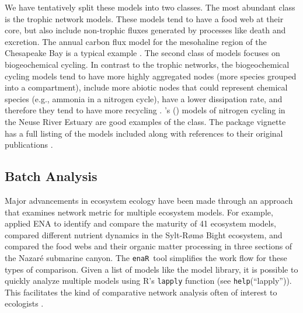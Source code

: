 \documentclass[11pt]{article}
\def\citeapos#1{\citeauthor{#1}'s (\citeyear{#1})}
\newcommand{\enaR}{\texttt{enaR}}
\begin{document}
\begin{spacing}{2}
We have tentatively split these models into two classes.  The most
abundant class is the trophic network models. %
These models tend to have a food web at their core, but also include
non-trophic fluxes generated by processes like death and excretion.
The annual carbon flux model for the mesohaline region of the
Chesapeake Bay is a typical example \citep{baird89}.  The second class
of models focuses on biogeochemical cycling.  %
In contrast to the trophic networks, the biogeochemical cycling models
tend to have more highly aggregated nodes (more species grouped into a
compartment), include more abiotic nodes that could represent chemical
species (e.g., ammonia in a nitrogen cycle), have a lower dissipation
rate, and therefore they tend to have more recycling
\citep{christian96, borrett10_idd}.  \citeapos{christian03} models of
nitrogen cycling in the Neuse River Estuary are good examples of the
class.  The package vignette has a full listing of the models included
along with references to their original publications \citep{enar}.

\subsection{Batch Analysis}
Major advancements in ecosystem ecology have been made through an
approach that examines network metric for multiple ecosystem
models. For example, \citet{christensen95} applied ENA to identify and
compare the maturity of 41 ecosystem models,
\citet{baird08_sylt} compared different nutrient dynamics in the
Sylt-R{\o}m{\o} Bight ecosystem, and \citet{vanoevelen2011canyon}
compared the food webs and their organic matter processing in three
sections of the Nazar{\'e} submarine canyon.  The \enaR\ tool
simplifies the work flow for these types of comparison. Given a list
of models like the model library, it is possible to quickly analyze
multiple models using R's \texttt{lapply} function (see
\texttt{help}(``lapply'')).  This facilitates the kind of comparative
network analysis often of interest to ecologists
\citep{monaco97,christian05_cnea}.


\end{spacing}
\end{document}
